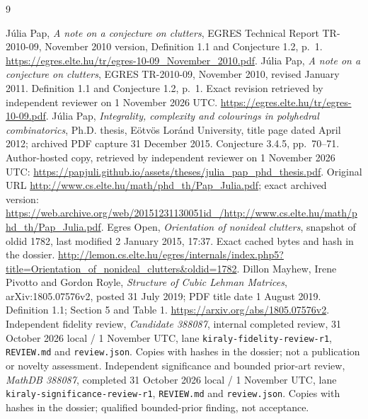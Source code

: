 \documentclass[11pt]{article}
\begin{document}
\clearpage
\begin{thebibliography}{9}
\raggedright
{} J\'ulia Pap, \emph{A note on a conjecture on clutters}, EGRES Technical Report TR-2010-09, November 2010 version, Definition 1.1 and Conjecture 1.2, p.~1.\newline
\url{https://egres.elte.hu/tr/egres-10-09_November_2010.pdf}.
 J\'ulia Pap, \emph{A note on a conjecture on clutters}, EGRES TR-2010-09, November 2010, revised January 2011. Definition 1.1 and Conjecture 1.2, p.~1. Exact revision retrieved by independent reviewer on 1 November 2026 UTC.\newline
\url{https://egres.elte.hu/tr/egres-10-09.pdf}.
 J\'ulia Pap, \emph{Integrality, complexity and colourings in polyhedral combinatorics}, Ph.D. thesis, E\"otv\"os Lor\'and University, title page dated April 2012; archived PDF capture 31 December 2015. Conjecture 3.4.5, pp.~70--71. Author-hosted copy, retrieved by independent reviewer on 1 November 2026 UTC: \url{https://papjuli.github.io/assets/theses/julia_pap_phd_thesis.pdf}. Original URL \url{http://www.cs.elte.hu/math/phd_th/Pap_Julia.pdf}; exact archived version:\newline
\url{https://web.archive.org/web/20151231130051id_/http://www.cs.elte.hu/math/phd_th/Pap_Julia.pdf}.
 Egres Open, \emph{Orientation of nonideal clutters}, snapshot of oldid 1782, last modified 2 January 2015, 17:37. Exact cached bytes and hash in the dossier.\newline
\url{http://lemon.cs.elte.hu/egres/internals/index.php5?title=Orientation_of_nonideal_clutters&oldid=1782}.
 Dillon Mayhew, Irene Pivotto and Gordon Royle, \emph{Structure of Cubic Lehman Matrices}, arXiv:1805.07576v2, posted 31 July 2019; PDF title date 1 August 2019. Definition 1.1; Section 5 and Table 1.\newline
\url{https://arxiv.org/abs/1805.07576v2}.
 Independent fidelity review, \emph{Candidate 388087}, internal completed review, 31 October 2026 local / 1 November UTC, lane \texttt{kiraly-fidelity-review-r1}, \texttt{REVIEW.md} and \texttt{review.json}. Copies with hashes in the dossier; not a publication or novelty assessment.
 Independent significance and bounded prior-art review, \emph{MathDB 388087}, completed 31 October 2026 local / 1 November UTC, lane \texttt{kiraly-significance-review-r1}, \texttt{REVIEW.md} and \texttt{review.json}. Copies with hashes in the dossier; qualified bounded-prior finding, not acceptance.
\end{thebibliography}
\end{document}
